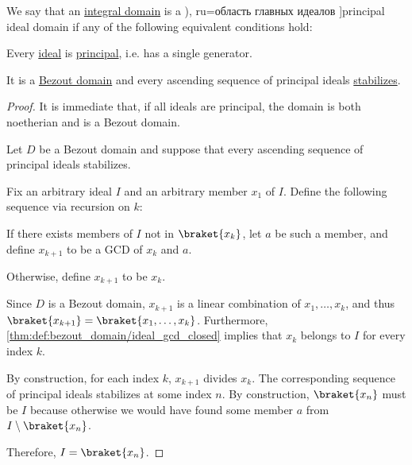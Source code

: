 \begin{definition}\label{def:principal_ideal_domain}
  We say that an \hyperref[def:integral_domain]{integral domain} is a \term[bg=област на главни идеали (\cite[def. VI.3]{ГеновМиховскиМоллов1991Алгебра}), ru=область главных идеалов \cite[def. 9.3]{Винберг2014КурсАлгебры}]{principal ideal domain} if any of the following equivalent conditions hold:
  \begin{thmenum}
     Every \hyperref[def:semiring_ideal]{ideal} is \hyperref[def:semiring_ideal/principal]{principal}, i.e. has a single generator.

     It is a \hyperref[def:bezout_domain]{Bezout domain} and every ascending sequence of principal ideals \hyperref[def:stabilizing_sequence]{stabilizes}.
  \end{thmenum}
\end{definition}
\begin{proof}
   It is immediate that, if all ideals are principal, the domain is both noetherian and is a Bezout domain.

   Let \( D \) be a Bezout domain and suppose that every ascending sequence of principal ideals stabilizes.

  Fix an arbitrary ideal \( I \) and an arbitrary member \( x_1 \) of \( I \). Define the following sequence via recursion on \( k \):
  \begin{displayquote}
    If there exists members of \( I \) not in \( \braket{ x_k } \), let \( a \) be such a member, and define \( x_{k+1} \) to be a GCD of \( x_k \) and \( a \).

    Otherwise, define \( x_{k+1} \) to be \( x_k \).
  \end{displayquote}

  Since \( D \) is a Bezout domain, \( x_{k+1} \) is a linear combination of \( x_1, \ldots, x_k \), and thus \( \braket{ x_{k+1} } = \braket{ x_1, \ldots, x_k } \). Furthermore, \cref{thm:def:bezout_domain/ideal_gcd_closed} implies that \( x_k \) belongs to \( I \) for every index \( k \).

  By construction, for each index \( k \), \( x_{k+1} \) divides \( x_k \). The corresponding sequence of principal ideals stabilizes at some index \( n \). By construction, \( \braket{ x_n } \) must be \( I \) because otherwise we would have found some member \( a \) from \( I \setminus \braket{ x_n } \).

  Therefore, \( I = \braket{ x_n } \).
\end{proof}

